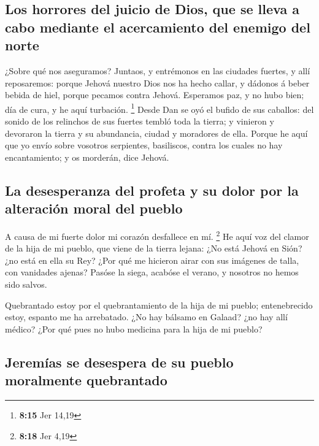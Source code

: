 \hypertarget{los-horrores-del-juicio-de-dios-que-se-lleva-a-cabo-mediante-el-acercamiento-del-enemigo-del-norte}{%
\subsection{Los horrores del juicio de Dios, que se lleva a cabo
mediante el acercamiento del enemigo del
norte}\label{los-horrores-del-juicio-de-dios-que-se-lleva-a-cabo-mediante-el-acercamiento-del-enemigo-del-norte}}

 ¿Sobre qué nos aseguramos? Juntaos, y entrémonos en las
ciudades fuertes, y allí reposaremos: porque Jehová nuestro Dios nos ha
hecho callar, y dádonos á beber bebida de hiel, porque pecamos contra
Jehová.  Esperamos paz, y no hubo bien; día de cura, y he
aquí turbación. \footnote{\textbf{8:15} Jer 14,19}  Desde
Dan se oyó el bufido de sus caballos: del sonido de los relinchos de sus
fuertes tembló toda la tierra; y vinieron y devoraron la tierra y su
abundancia, ciudad y moradores de ella.  Porque he aquí
que yo envío sobre vosotros serpientes, basiliscos, contra los cuales no
hay encantamiento; y os morderán, dice Jehová.

\hypertarget{la-desesperanza-del-profeta-y-su-dolor-por-la-alteraciuxf3n-moral-del-pueblo}{%
\subsection{La desesperanza del profeta y su dolor por la alteración
moral del
pueblo}\label{la-desesperanza-del-profeta-y-su-dolor-por-la-alteraciuxf3n-moral-del-pueblo}}

 A causa de mi fuerte dolor mi corazón desfallece en mí.
\footnote{\textbf{8:18} Jer 4,19}  He aquí voz del clamor
de la hija de mi pueblo, que viene de la tierra lejana: ¿No está Jehová
en Sión? ¿no está en ella su Rey? ¿Por qué me hicieron airar con sus
imágenes de talla, con vanidades ajenas?  Pasóse la
siega, acabóse el verano, y nosotros no hemos sido salvos.

 Quebrantado estoy por el quebrantamiento de la hija de
mi pueblo; entenebrecido estoy, espanto me ha arrebatado.
 ¿No hay bálsamo en Galaad? ¿no hay allí médico? ¿Por qué
pues no hubo medicina para la hija de mi pueblo?

\hypertarget{jeremuxedas-se-desespera-de-su-pueblo-moralmente-quebrantado}{%
\subsection{Jeremías se desespera de su pueblo moralmente
quebrantado}\label{jeremuxedas-se-desespera-de-su-pueblo-moralmente-quebrantado}}

